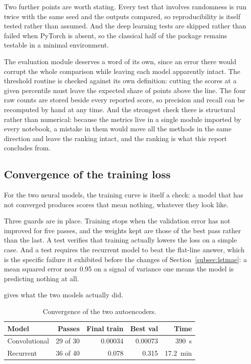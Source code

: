 \documentclass[a4paper, 12pt]{article}
\begin{document}
Two further points are worth stating. Every test that involves randomness is run
twice with the same seed and the outputs compared, so reproducibility is itself
tested rather than assumed. And the deep learning tests are skipped rather than
failed when PyTorch is absent, so the classical half of the package remains
testable in a minimal environment.

The evaluation module deserves a word of its own, since an error there would
corrupt the whole comparison while leaving each model apparently intact. The
threshold routine is checked against its own definition: cutting the scores at a
given percentile must leave the expected share of points above the line. The four
raw counts are stored beside every reported score, so precision and recall can be
recomputed by hand at any time. And the strongest check there is structural rather
than numerical: because the metrics live in a single module imported by every
notebook, a mistake in them would move all the methods in the same direction and
leave the ranking intact, and the ranking is what this report concludes from.

\subsection{Convergence of the training loss} \label{subsec:convergence}

For the two neural models, the training curve is itself a check: a model that has
not converged produces scores that mean nothing, whatever they look like.

Three guards are in place. Training stops when the validation error has not
improved for five passes, and the weights kept are those of the best pass rather
than the last. A test verifies that training actually lowers the loss on a simple
case. And a test requires the recurrent model to beat the flat-line answer, which
is the specific failure it exhibited before the changes of
Section~\ref{subsec:lstmae}: a mean squared error near \num{0.95} on a signal of
variance one means the model is predicting nothing at all.

 gives what the two models actually did.

\begin{table}[htbp]
  \centering
  \small
  \caption{Convergence of the two autoencoders.}
  \label{tab:convergence}
  \begin{tabular}{@{}lrrrr@{}}
    \toprule
    \textbf{Model} & \textbf{Passes} & \textbf{Final train} & \textbf{Best val}
      & \textbf{Time} \\
    \midrule
    Convolutional & 29 of 30 & \num{0.00034} & \num{0.00073} & \SI{390}{\second} \\
    Recurrent     & 36 of 40 & \num{0.078}   & \num{0.315}   & \SI{17.2}{\minute} \\
    \bottomrule
  \end{tabular}
\end{table}
\end{document}
